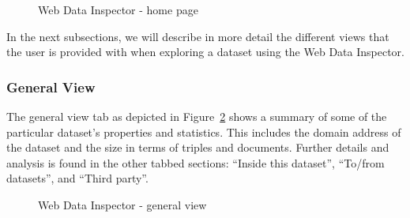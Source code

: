 \begin{figure}
	\centering
	\caption{Web Data Inspector - home page}
	\label{fig:wdi:home-page}
\end{figure}

In the next subsections, we will describe in more detail the different views that the user is provided with when exploring a dataset using the Web Data Inspector. 

\subsubsection{General View}

The general view tab as depicted in Figure~\ref{fig:wdi:generalView} shows a summary of some of the particular dataset's properties and statistics. This includes the domain address of the dataset and the size in terms of triples and documents. Further details and analysis is found in the other tabbed sections: ``Inside this dataset'', ``To/from datasets'', and ``Third party''.

\begin{figure}
	\centering
	\caption{Web Data Inspector - general view}
	\label{fig:wdi:generalView}
\end{figure}

